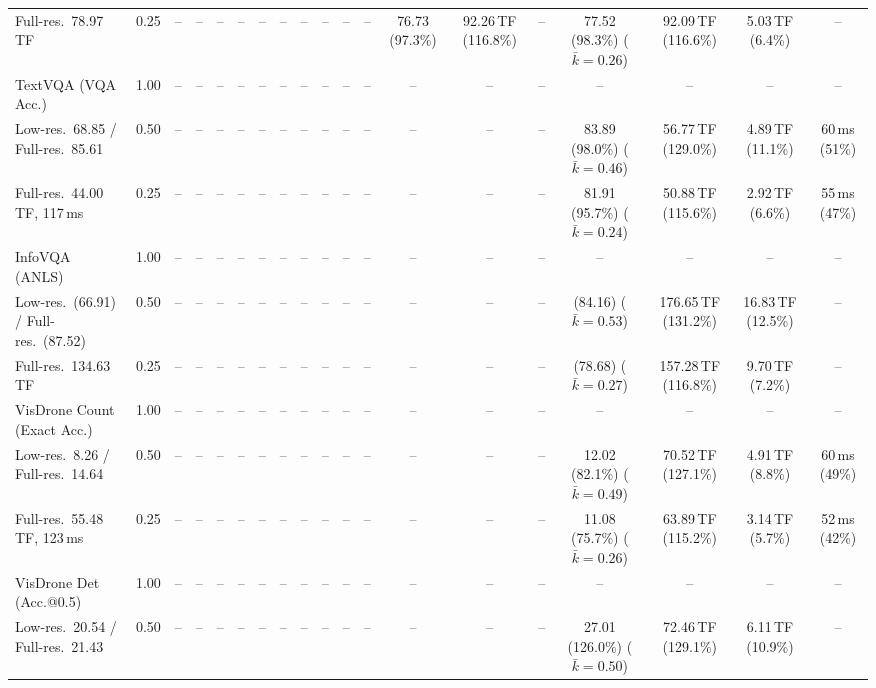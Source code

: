 \begin{table}[t]
{\begin{tabular}{l c | c c c c | c c c c | c c | c c c | c c c c}
{\footnotesize Full-res.\ 78.97\,TF} & 0.25 & -- & -- & -- & -- & -- & -- & -- & -- & -- & -- & 76.73 (97.3\%) & 92.26\,TF (116.8\%) & -- & \cellcolor{gray!15}77.52 (98.3\%) {\footnotesize ($\bar k{=}0.26$)} & 92.09\,TF (116.6\%) & 5.03\,TF (6.4\%) & -- \\
\cmidrule(lr){1-19}
TextVQA (VQA Acc.) & 1.00 & -- & -- & -- & -- & -- & -- & -- & -- & -- & -- & -- & -- & -- & -- & -- & -- & -- \\
{\footnotesize Low-res.\ 68.85 / Full-res.\ 85.61} & 0.50 & -- & -- & -- & -- & -- & -- & -- & -- & -- & -- & -- & -- & -- & 83.89 (98.0\%) {\footnotesize ($\bar k{=}0.46$)} & 56.77\,TF (129.0\%) & 4.89\,TF (11.1\%) & 60\,ms (51\%) \\
{\footnotesize Full-res.\ 44.00\,TF, 117\,ms} & 0.25 & -- & -- & -- & -- & -- & -- & -- & -- & -- & -- & -- & -- & -- & 81.91 (95.7\%) {\footnotesize ($\bar k{=}0.24$)} & 50.88\,TF (115.6\%) & 2.92\,TF (6.6\%) & 55\,ms (47\%) \\
\cmidrule(lr){1-19}
InfoVQA (ANLS) & 1.00 & -- & -- & -- & -- & -- & -- & -- & -- & -- & -- & -- & -- & -- & -- & -- & -- & -- \\
{\footnotesize Low-res.\ (66.91) / Full-res.\ (87.52)} & 0.50 & -- & -- & -- & -- & -- & -- & -- & -- & -- & -- & -- & -- & -- & (84.16) {\footnotesize ($\bar k{=}0.53$)} & 176.65\,TF (131.2\%) & 16.83\,TF (12.5\%) & -- \\
{\footnotesize Full-res.\ 134.63\,TF} & 0.25 & -- & -- & -- & -- & -- & -- & -- & -- & -- & -- & -- & -- & -- & (78.68) {\footnotesize ($\bar k{=}0.27$)} & 157.28\,TF (116.8\%) & 9.70\,TF (7.2\%) & -- \\
\cmidrule(lr){1-19}
VisDrone Count (Exact Acc.) & 1.00 & -- & -- & -- & -- & -- & -- & -- & -- & -- & -- & -- & -- & -- & -- & -- & -- & -- \\
{\footnotesize Low-res.\ 8.26 / Full-res.\ 14.64} & 0.50 & -- & -- & -- & -- & -- & -- & -- & -- & -- & -- & -- & -- & -- & 12.02 (82.1\%) {\footnotesize ($\bar k{=}0.49$)} & 70.52\,TF (127.1\%) & 4.91\,TF (8.8\%) & 60\,ms (49\%) \\
{\footnotesize Full-res.\ 55.48\,TF, 123\,ms} & 0.25 & -- & -- & -- & -- & -- & -- & -- & -- & -- & -- & -- & -- & -- & 11.08 (75.7\%) {\footnotesize ($\bar k{=}0.26$)} & 63.89\,TF (115.2\%) & 3.14\,TF (5.7\%) & 52\,ms (42\%) \\
\cmidrule(lr){1-19}
VisDrone Det (Acc.@0.5) & 1.00 & -- & -- & -- & -- & -- & -- & -- & -- & -- & -- & -- & -- & -- & -- & -- & -- & -- \\
{\footnotesize Low-res.\ 20.54 / Full-res.\ 21.43} & 0.50 & -- & -- & -- & -- & -- & -- & -- & -- & -- & -- & -- & -- & -- & \cellcolor{gray!15}27.01 (126.0\%) {\footnotesize ($\bar k{=}0.50$)} & 72.46\,TF (129.1\%) & 6.11\,TF (10.9\%) & -- \\

\end{tabular}}
\end{table}
